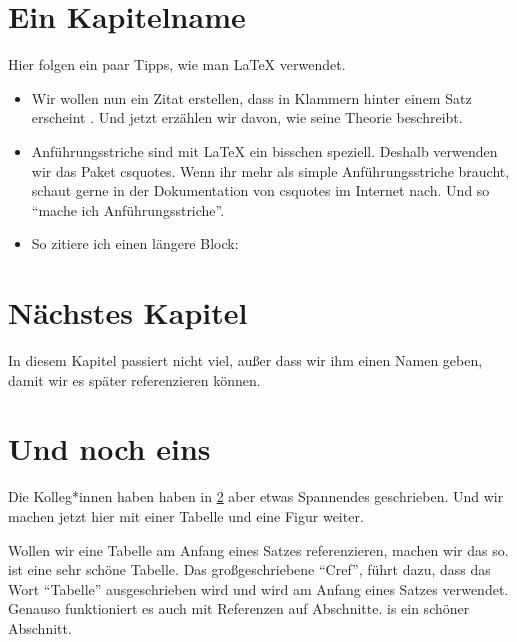 \documentclass{dsadokumentation}
\begin{document}
\section{Ein Kapitelname}

Hier folgen ein paar Tipps, wie man \LaTeX{} verwendet.

\begin{itemize}
	\item Wir wollen nun ein Zitat erstellen, dass in Klammern hinter einem Satz erscheint \parencite{k2.6.somelabel}. Und jetzt erzählen wir davon, wie \textcite{k2.6.somelabel} seine Theorie beschreibt.

	\item Anführungsstriche sind mit \LaTeX{} ein bisschen speziell. Deshalb verwenden wir das Paket csquotes. Wenn ihr mehr als simple Anführungsstriche braucht, schaut gerne in der Dokumentation von csquotes im Internet nach. Und so \enquote{mache ich Anführungsstriche}.

	\item So zitiere ich einen längere Block: 
\end{itemize}

\section{Nächstes Kapitel}\label{k2.6.ch.einkapitel}

In diesem Kapitel passiert nicht viel, außer dass wir ihm einen Namen geben, damit wir es später referenzieren können.

\section{Und noch eins}

Die Kolleg*innen haben haben in \cref{k2.6.ch.einkapitel} aber etwas Spannendes geschrieben.
Und wir machen jetzt hier mit einer Tabelle und eine Figur weiter.

Wollen wir eine Tabelle am Anfang eines Satzes referenzieren, machen wir das so.  ist eine sehr schöne Tabelle. Das großgeschriebene \enquote{Cref}, führt dazu, dass das Wort \enquote{Tabelle} ausgeschrieben wird und wird am Anfang eines Satzes verwendet. Genauso funktioniert es auch mit Referenzen auf Abschnitte.  is ein schöner Abschnitt.
\end{document}

